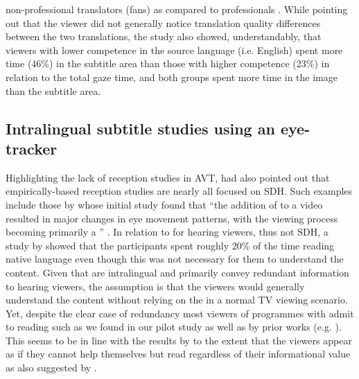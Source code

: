 \documentclass[output=paper]{langsci/langscibook}
\begin{document}
non-professional translators (fans) as compared to professionals \citep{orrego2014}. While pointing out that the viewer did not generally notice translation quality differences between the two translations, the study also showed, understandably, that viewers with lower competence in the source language (i.e. English) spent more time (46\%) in the subtitle area than those with higher competence (23\%) in relation to the total gaze time, and both groups spent more time in the image than the subtitle area.


\subsection{Intralingual subtitle studies using an eye-tracker}

Highlighting the lack of reception studies in AVT, \citet[30]{gambier2008} had also pointed out that empirically-based reception studies are nearly all focused on SDH.  Such examples include those by \citep{jensema2000a, jensema2000b} whose initial study found that ``the addition of  to a video resulted in major changes in eye movement patterns, with the viewing process becoming primarily a '' \citep[275]{jensema2000a}. In relation to  for hearing viewers, thus not SDH, a study by \citet{dydewalle1991} showed that the participants spent roughly 20\% of the time reading native language  even though this was not necessary for them to understand the content. Given that  are intralingual and primarily convey redundant information to hearing viewers, the assumption is that the viewers would generally understand the content without relying on the  in a normal TV viewing scenario. Yet, despite the clear case of redundancy most viewers of programmes with  admit to reading such  as we found in our pilot study as well as by prior works (e.g. \citealt{Kimura2000}). This seems to be in line with the results by \citet{dydewalle1991} to the extent that the viewers appear as if they cannot help themselves but read  regardless of their informational value as also suggested by \citet{bisson2014}. 
\end{document}
